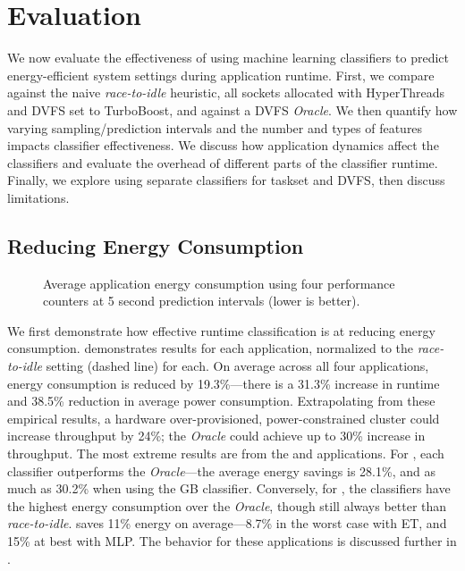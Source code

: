 \section{Evaluation}
\label{sec:classifiers-evaluation}

We now evaluate the effectiveness of using machine learning classifiers to predict energy-efficient system settings during application runtime.
First, we compare against the naive \emph{race-to-idle} heuristic, \ie all sockets allocated with HyperThreads and DVFS set to TurboBoost, and against a DVFS \emph{Oracle}.
We then quantify how varying sampling/prediction intervals and the number and types of features impacts classifier effectiveness.
We discuss how application dynamics affect the classifiers and evaluate the overhead of different parts of the classifier runtime.
Finally, we explore using separate classifiers for taskset and DVFS, then discuss limitations.


\subsection{Reducing Energy Consumption}
\label{sec:eval-first}

\begin{figure}[t]
  \centering
  
  \caption{Average application energy consumption using four performance counters at 5 second prediction intervals (lower is better).}
  \label{fig:compare-apps-pca4}
\end{figure}

We first demonstrate how effective runtime classification is at reducing energy consumption.
 demonstrates results for each application, normalized to the \emph{race-to-idle} setting (dashed line) for each.
On average across all four applications, energy consumption is reduced by 19.3\%---there is a 31.3\% increase in runtime and 38.5\% reduction in average power consumption.
Extrapolating from these empirical results, a hardware over-provisioned, power-constrained cluster could increase throughput by 24\%; the \emph{Oracle} could achieve up to 30\% increase in throughput.
The most extreme results are from the  and  applications.
For , each classifier outperforms the \emph{Oracle}---the average energy savings is 28.1\%, and as much as 30.2\% when using the GB classifier.
Conversely, for , the classifiers have the highest energy consumption over the \emph{Oracle}, though still always better than \emph{race-to-idle}.
 saves 11\% energy on average---8.7\% in the worst case with ET, and 15\% at best with MLP.
The behavior for these applications is discussed further in .


